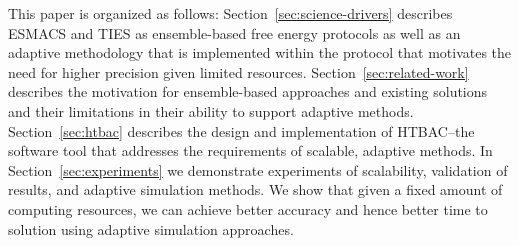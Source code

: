 This paper is organized as follows: 
Section~\ref{sec:science-drivers} describes ESMACS and TIES as ensemble-based 
free energy protocols as well as an adaptive methodology that is implemented 
within the protocol that motivates the need for higher precision given limited 
resources. 
Section~\ref{sec:related-work} describes the motivation for ensemble-based 
approaches and existing solutions and their limitations in their ability to 
support adaptive methods.  
Section~\ref{sec:htbac} describes the design and implementation of 
HTBAC--the software tool that addresses the requirements of scalable, 
adaptive methods. 
In Section~\ref{sec:experiments} we demonstrate experiments of scalability, 
validation of results, and adaptive simulation methods. We show that given a 
fixed amount of computing resources, we can achieve better accuracy and hence 
better time to solution using adaptive simulation approaches. 





